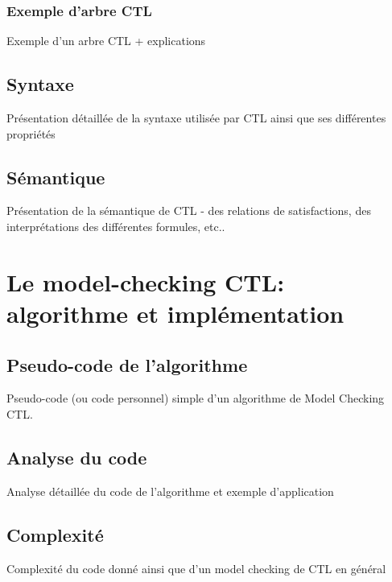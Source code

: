 \documentclass[runningheads,a4paper,11pt]{llncs}
\begin{document}
\subsubsection{Exemple d'arbre CTL}
Exemple d'un arbre CTL + explications

\subsection{Syntaxe}
Présentation détaillée de la syntaxe utilisée par CTL ainsi que ses différentes propriétés 

\subsection{Sémantique}
Présentation de la sémantique de CTL - des relations de satisfactions, des interprétations des différentes formules, etc.. 

\section{Le model-checking CTL: algorithme et implémentation}
\subsection{Pseudo-code de l'algorithme}
Pseudo-code (ou code personnel) simple d'un algorithme de Model Checking CTL. 

\subsection{Analyse du code}
Analyse détaillée du code de l'algorithme et exemple d'application 

\subsection{Complexité}
Complexité du code donné ainsi que d'un model checking de CTL en général 


\nocite{*} 
\end{document}
